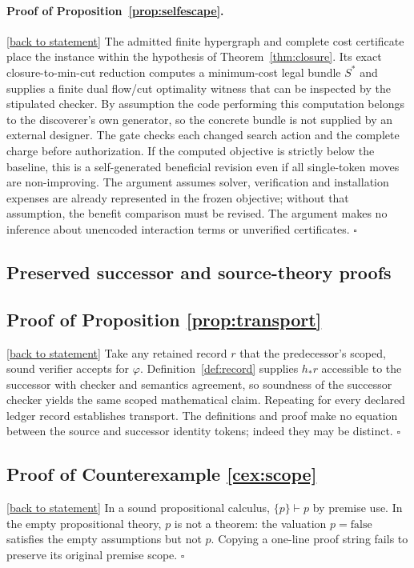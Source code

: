 \documentclass[11pt,letterpaper]{article}
\theoremstyle{definition}
\theoremstyle{remark}
\newcommand{\backlink}[1]{\hyperlink{claim:#1}{\footnotesize[back to statement]}}
\begin{document}
\paragraph{Proof of Proposition~\ref{prop:selfescape}.}\hypertarget{proof:selfescape}{}\backlink{selfescape}
The admitted finite hypergraph and complete cost certificate place the instance within the hypothesis of Theorem~\ref{thm:closure}. Its exact closure-to-min-cut reduction computes a minimum-cost legal bundle $S^*$ and supplies a finite dual flow/cut optimality witness that can be inspected by the stipulated checker. By assumption the code performing this computation belongs to the discoverer's own generator, so the concrete bundle is not supplied by an external designer. The gate checks each changed search action and the complete charge before authorization. If the computed objective is strictly below the baseline, this is a self-generated beneficial revision even if all single-token moves are non-improving. The argument assumes solver, verification and installation expenses are already represented in the frozen objective; without that assumption, the benefit comparison must be revised. The argument makes no inference about unencoded interaction terms or unverified certificates. $\square$


\subsection*{Preserved successor and source-theory proofs}
\hypertarget{proof:transport}{}\subsection*{Proof of Proposition \ref{prop:transport}}\backlink{transport}
Take any retained record $r$ that the predecessor's scoped, sound verifier accepts for $\varphi$. Definition~\ref{def:record} supplies $h_*r$ accessible to the successor with checker and semantics agreement, so soundness of the successor checker yields the same scoped mathematical claim. Repeating for every declared ledger record establishes transport. The definitions and proof make no equation between the source and successor identity tokens; indeed they may be distinct. $\square$

\hypertarget{proof:scope}{}\subsection*{Proof of Counterexample \ref{cex:scope}}\backlink{scope}
In a sound propositional calculus, $\{p\}\vdash p$ by premise use. In the empty propositional theory, $p$ is not a theorem: the valuation $p=\mathrm{false}$ satisfies the empty assumptions but not $p$. Copying a one-line proof string fails to preserve its original premise scope. $\square$
\end{document}
